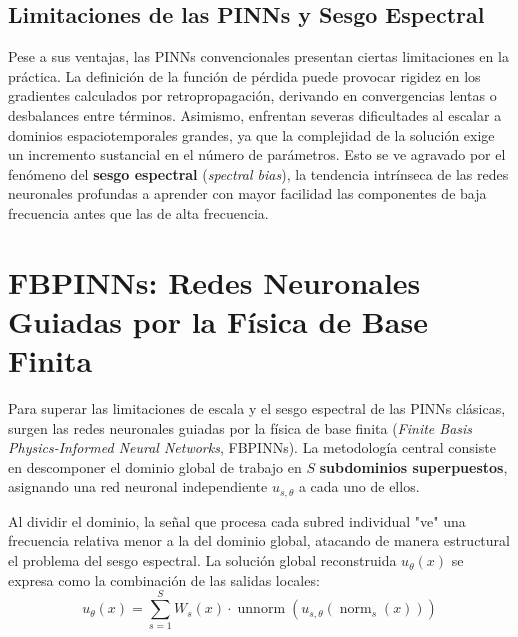 \subsection{Limitaciones de las PINNs y Sesgo Espectral}
Pese a sus ventajas, las PINNs convencionales presentan ciertas limitaciones en la práctica. La definición de la función de pérdida puede provocar rigidez en los gradientes calculados por retropropagación, derivando en convergencias lentas o desbalances entre términos. Asimismo, enfrentan severas dificultades al escalar a dominios espaciotemporales grandes, ya que la complejidad de la solución exige un incremento sustancial en el número de parámetros. Esto se ve agravado por el fenómeno del \textbf{sesgo espectral} (\textit{spectral bias}), la tendencia intrínseca de las redes neuronales profundas a aprender con mayor facilidad las componentes de baja frecuencia antes que las de alta frecuencia.

\section{FBPINNs: Redes Neuronales Guiadas por la Física de Base Finita}

Para superar las limitaciones de escala y el sesgo espectral de las PINNs clásicas, surgen las redes neuronales guiadas por la física de base finita (\textit{Finite Basis Physics-Informed Neural Networks}, FBPINNs). La metodología central consiste en descomponer el dominio global de trabajo en $S$ \textbf{subdominios superpuestos}, asignando una red neuronal independiente $u_{s,\theta}$ a cada uno de ellos.

Al dividir el dominio, la señal que procesa cada subred individual "ve" una frecuencia relativa menor a la del dominio global, atacando de manera estructural el problema del sesgo espectral. La solución global reconstruida $u_\theta(x)$ se expresa como la combinación de las salidas locales:
\begin{equation}
    u_\theta(x) = \sum_{s=1}^{S} W_s(x) \cdot \operatorname{unnorm}\left( u_{s,\theta}\left( \operatorname{norm}_s(x) \right) \right)
\end{equation}


